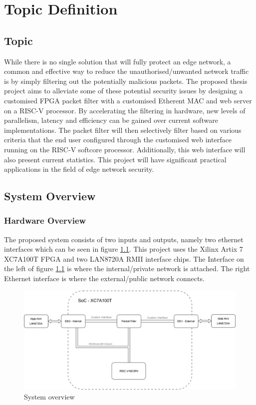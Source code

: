 \chapter[Topic Definition]{Topic Definition}
\label{Chap:label}	%
\pagestyle{headings}


\section{Topic}





While there is no single solution that will fully protect an edge network, a common and effective way to reduce the unauthorised/unwanted network 
traffic is by simply filtering out the potentially malicious packets. The proposed thesis project aims to alleviate some of these potential security issues by 
designing a customised FPGA packet filter with a customised Etherent MAC and web server on a RISC-V processor.  By accelerating the filtering in hardware, 
new levels of parallelism, latency and efficiency can be gained over current software implementations. The packet filter will then selectively filter based on various 
criteria that the end user configured through the customised web interface running on the RISC-V softcore processor. Additionally, this web interface will also 
present current statistics.  This project will have significant practical applications in the field of edge network security.


\section{System Overview}
\subsection{Hardware Overview}

The proposed system consists of two inputs and outputs, namely two ethernet interfaces which can be seen in figure \ref{fig:sys-overview}. This project uses the 
Xilinx Artix 7 XC7A100T FPGA and two LAN8720A RMII interface chips. The Interface on the left of figure \ref{fig:sys-overview} is where the internal/private 
network is attached. The right Ethernet interface is where the external/public network connects. 

\begin{figure}[h]
    \centering
    \includegraphics[width=1\textwidth]{Images/ThesisSystemsOverview.png}
    \caption{System overview}
    \label{fig:sys-overview}
\end{figure}

